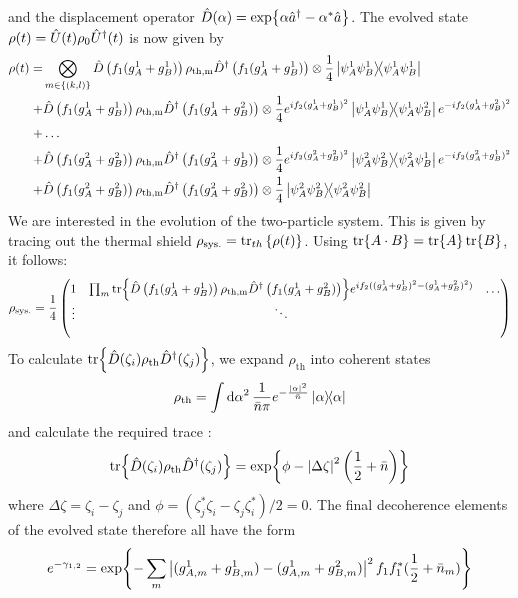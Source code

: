 and the displacement operator $\hat{D}(\alpha)=\exp{\alpha \hat{a}^\dagger - \alpha^*\hat{a}}$. The evolved state $\rho(t)=\hat{U}(t)\rho_0\hat{U}^\dagger(t)$ is now given by
\begin{align}
\begin{split}
  \rho(t) =& \bigotimes_{m\in\{(k,l)\}} \hat{D}\left(f_1(g^1_A + g^1_B)\right)\rho_\mathrm{th,m}\hat{D}^\dagger\left(f_1(g^1_A + g^1_B)\right) \otimes \frac{1}{4} \ketbra{\psi^1_A\psi^1_B} \\
  +& \hat{D}\left(f_1(g^1_A + g^1_B)\right)\rho_\mathrm{th,m}\hat{D}^\dagger\left(f_1(g^1_A + g^2_B)\right) \otimes \frac{1}{4} e^{if_2(g^1_A + g^1_B)^2} \ketbra{\psi^1_A\psi^1_B}{\psi^1_A\psi^2_B} e^{-if_2(g^1_A + g^2_B)^2} \\
  +& \dots \\
  +& \hat{D}\left(f_1(g^2_A + g^2_B)\right)\rho_\mathrm{th,m}\hat{D}^\dagger\left(f_1(g^2_A + g^1_B)\right) \otimes \frac{1}{4} e^{if_2(g^2_A + g^2_B)^2} \ketbra{\psi^2_A\psi^2_B}{\psi^2_A\psi^1_B} e^{-if_2(g^2_A + g^1_B)^2} \\
  +& \hat{D}\left(f_1(g^2_A + g^2_B)\right)\rho_\mathrm{th,m}\hat{D}^\dagger\left(f_1(g^2_A + g^2_B)\right) \otimes \frac{1}{4}\ketbra{\psi^2_A\psi^2_B}
\end{split}
\end{align}
We are interested in the evolution of the two-particle system. This is given by tracing out the thermal shield $\rho_\mathrm{sys.} = \tr_{th}\left\{\rho(t)\right\}$. Using $\tr{A\cdot B} = \tr{A}\tr{B}$, it follows:
\begin{equation}
  \rho_\mathrm{sys.} = \frac{1}{4}\begin{pmatrix}
    1 & \prod_{m}\tr{\hat{D}\left(f_1(g^1_A + g^1_B)\right)\rho_\mathrm{th,m}\hat{D}^\dagger\left(f_1(g^1_A + g^2_B)\right)} e^{i f_2((g^1_A + g^1_B)^2 - (g^1_A + g^2_B)^2)} & \dots \\
    \vdots & \ddots & \\
    & & 
  \end{pmatrix}
\end{equation}
To calculate $\tr{\hat{D}(\zeta_i)\rho_\mathrm{th}\hat{D}^\dagger(\zeta_j)}$, we expand $\rho_\mathrm{th}$ into coherent states \cite{Steiner_2024}
\begin{equation}
  \rho_\mathrm{th} = \int \dd \alpha^2 \, \frac{1}{\bar{n}\pi} e^{-\frac{\left\lvert\alpha\right\rvert^2}{\bar{n}}} \ketbra{\alpha}
\end{equation}
and calculate the required trace \cite{Steiner_2024}:
\begin{equation}
  \tr{\hat{D}(\zeta_i)\rho_\mathrm{th}\hat{D}^\dagger(\zeta_j)} = \exp{\phi - \left\lvert\Delta \zeta\right\rvert^2 \left(\frac{1}{2} + \bar{n}\right)}
\end{equation}
where $\Delta \zeta = \zeta_i - \zeta_j$ and $\phi = (\zeta_j^*\zeta_i - \zeta_j\zeta_i^*)/2 = 0$.
The final decoherence elements of the evolved state therefore all have the form
\begin{equation}
  e^{-\gamma_{1,2}} = \exp{- \sum_{m} \left\lvert(g^1_{A,m} + g^1_{B,m})-(g^1_{A,m} + g^2_{B,m})\right\rvert^2 f_1f^*_1 (\frac{1}{2} + \bar{n}_m)}
\end{equation}


